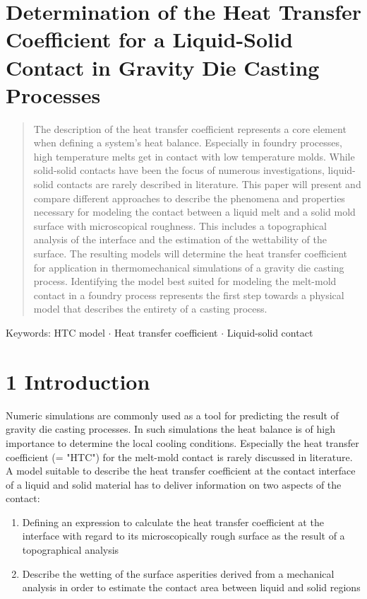 \documentclass[10pt]{article}
\begin{document}
\section*{Determination of the Heat Transfer Coefficient for a Liquid-Solid Contact in Gravity Die Casting Processes }


\begin{abstract}
The description of the heat transfer coefficient represents a core element when defining a system's heat balance. Especially in foundry processes, high temperature melts get in contact with low temperature molds. While solid-solid contacts have been the focus of numerous investigations, liquid-solid contacts are rarely described in literature. This paper will present and compare different approaches to describe the phenomena and properties necessary for modeling the contact between a liquid melt and a solid mold surface with microscopical roughness. This includes a topographical analysis of the interface and the estimation of the wettability of the surface. The resulting models will determine the heat transfer coefficient for application in thermomechanical simulations of a gravity die casting process. Identifying the model best suited for modeling the melt-mold contact in a foundry process represents the first step towards a physical model that describes the entirety of a casting process.
\end{abstract}

Keywords: HTC model $\cdot$ Heat transfer coefficient $\cdot$ Liquid-solid contact

\section*{1 Introduction}
Numeric simulations are commonly used as a tool for predicting the result of gravity die casting processes. In such simulations the heat balance is of high importance to determine the local cooling conditions. Especially the heat transfer coefficient (= "HTC") for the melt-mold contact is rarely discussed in literature. A model suitable to describe the heat transfer coefficient at the contact interface of a liquid and solid material has to deliver information on two aspects of the contact:

\begin{enumerate}
  \item Defining an expression to calculate the heat transfer coefficient at the interface with regard to its microscopically rough surface as the result of a topographical analysis

  \item Describe the wetting of the surface asperities derived from a mechanical analysis in order to estimate the contact area between liquid and solid regions

\end{enumerate}
\end{document}
